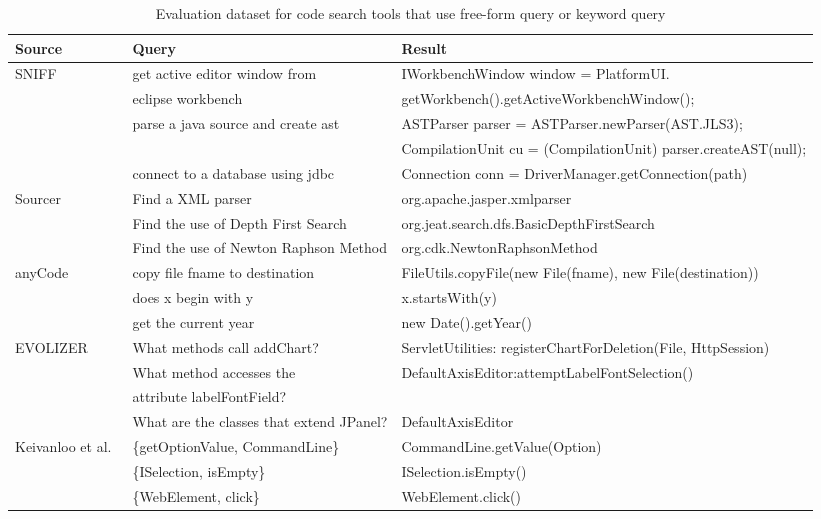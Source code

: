 \begin{table*}[ht]
\begin{center}
\caption{Evaluation dataset for code search tools that use free-form query or keyword query}
\label{tab:total}
\vspace{1mm}
\scriptsize{
\begin{tabular*}{1\textwidth}{@{}l|l|l@{}} \hline
Source&Query&Result\\\hline
SNIFF~\cite{sniff:Sen09}&get active editor window from&IWorkbenchWindow window = PlatformUI.\\
& eclipse workbench&getWorkbench().getActiveWorkbenchWindow();\\
&parse a java source and create ast&ASTParser parser = ASTParser.newParser(AST.JLS3);\\
&&CompilationUnit cu = (CompilationUnit) parser.createAST(null);\\
&connect to a database using jdbc&Connection conn = DriverManager.getConnection(path)\\ \hline
Sourcer~\cite{Sourcerer:SC14}&Find a XML parser&org.apache.jasper.xmlparser\\
&Find the use of Depth First Search&org.jeat.search.dfs.BasicDepthFirstSearch\\
&Find the use of Newton Raphson Method&org.cdk.NewtonRaphsonMethod\\ \hline
anyCode~\cite{Gvero:ICSE15}&copy file fname to destination&FileUtils.copyFile(new File(fname), new File(destination))\\
&does x begin with y&x.startsWith(y)\\
&get the current year&new Date().getYear()\\ \hline
EVOLIZER~\cite{gall:nlQueryICSE10}&What methods call addChart?&ServletUtilities: registerChartForDeletion(File, HttpSession)\\
&What method accesses the&DefaultAxisEditor:attemptLabelFontSelection()\\
& attribute labelFontField?\\
&What are the classes that extend JPanel?&DefaultAxisEditor \\ \hline
Keivanloo et al.~\cite{spotWork:ICSE14}&\{getOptionValue, CommandLine\}&CommandLine.getValue(Option)\\
&\{ISelection, isEmpty\}&ISelection.isEmpty()\\
&\{WebElement, click\}&WebElement.click() \\\hline
\end{tabular*}
 \label{tab:freeform}
}
 \end{center}
\end{table*}

